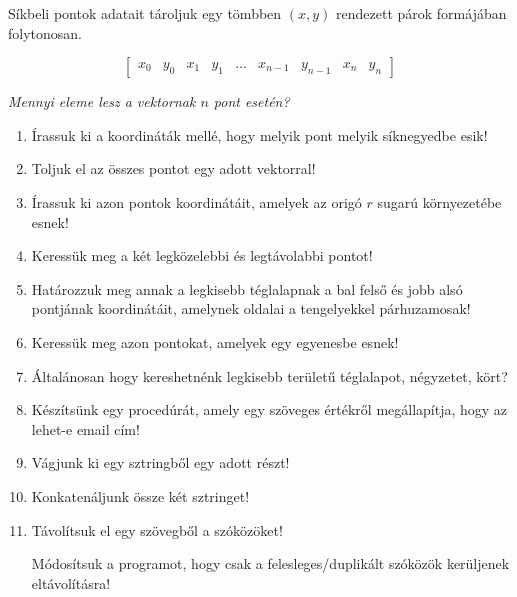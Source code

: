 \documentclass[a4paper]{article}
\begin{document}
Síkbeli pontok adatait tároljuk egy tömbben $(x, y)$ rendezett párok formájában folytonosan.

$$ [
\begin{array}{ccccccccc}
x_0 & y_0 & x_1 & y_1 & \ldots & x_{n-1} & y_{n-1} & x_n & y_n
\end{array}
] $$

\noindent \textit{Mennyi eleme lesz a vektornak $n$ pont esetén?}

\begin{enumerate}

\item

Írassuk ki a koordináták mellé, hogy melyik pont melyik síknegyedbe esik!

\item

Toljuk el az összes pontot egy adott vektorral!

\item

Írassuk ki azon pontok koordinátáit, amelyek az origó $r$ sugarú környezetébe esnek!

\item

Keressük meg a két legközelebbi és legtávolabbi pontot!

\item

Határozzuk meg annak a legkisebb téglalapnak a bal felső és jobb alsó pontjának koordinátáit, amelynek oldalai a tengelyekkel párhuzamosak!

\item

Keressük meg azon pontokat, amelyek egy egyenesbe esnek!

\item

Általánosan hogy kereshetnénk legkisebb területű téglalapot, négyzetet, kört?

\item

Készítsünk egy procedúrát, amely egy szöveges értékről megállapítja, hogy az lehet-e email cím!

\item

Vágjunk ki egy sztringből egy adott részt!

\item

Konkatenáljunk össze két sztringet!

\item

Távolítsuk el egy szövegből a szóközöket!

\medskip

Módosítsuk a programot, hogy csak a felesleges/duplikált szóközök kerüljenek eltávolításra!

\end{enumerate}
\end{document}
